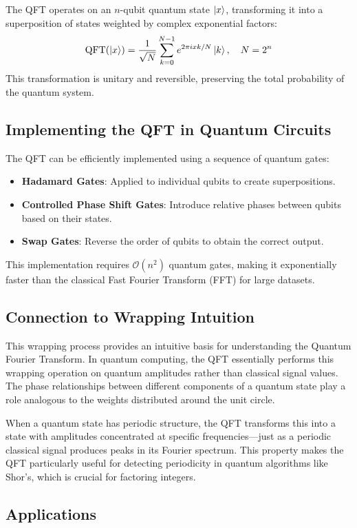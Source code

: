 \documentclass{article}
\begin{document}
The QFT operates on an $n$-qubit quantum state $\ket{x}$, transforming it into a superposition of states weighted by complex exponential factors:
\[
    \text{QFT}(\ket{x}) = \frac{1}{\sqrt{N}} \sum_{k=0}^{N-1} e^{2\pi i xk / N} \ket{k}, \quad N = 2^n
\]
This transformation is unitary and reversible, preserving the total probability of the quantum system.

\subsection{Implementing the QFT in Quantum Circuits}

The QFT can be efficiently implemented using a sequence of quantum gates:
\begin{itemize}
    \item \textbf{Hadamard Gates}: Applied to individual qubits to create superpositions.
    \item \textbf{Controlled Phase Shift Gates}: Introduce relative phases between qubits based on their states.
    \item \textbf{Swap Gates}: Reverse the order of qubits to obtain the correct output.
\end{itemize}

This implementation requires $\mathcal{O}(n^2)$ quantum gates, making it exponentially faster than the classical Fast Fourier Transform (FFT) for large datasets.

\subsection{Connection to Wrapping Intuition}

This wrapping process provides an intuitive basis for understanding the Quantum Fourier Transform. In quantum computing, the QFT essentially performs this wrapping operation on quantum amplitudes rather than classical signal values. The phase relationships between different components of a quantum state play a role analogous to the weights distributed around the unit circle.

When a quantum state has periodic structure, the QFT transforms this into a state with amplitudes concentrated at specific frequencies—just as a periodic classical signal produces peaks in its Fourier spectrum. This property makes the QFT particularly useful for detecting periodicity in quantum algorithms like Shor's, which is crucial for factoring integers.

\subsection{Applications}
\end{document}
